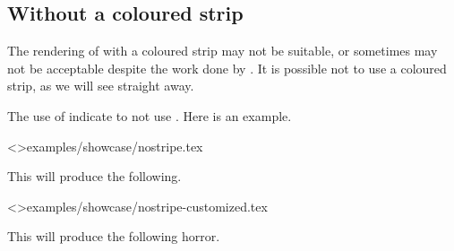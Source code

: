 \documentclass{tutodoc}
\begin{document}
\subsection{Without a coloured strip}

The rendering of  with a coloured strip may not be suitable, or sometimes may not be acceptable despite the work done by .
It is possible not to use a coloured strip, as we will see straight away.


\begin{tdocexa}
    The use of  indicate to not use .
    Here is an example.

    \tdoclatexinput<>{examples/showcase/nostripe.tex}

    This will produce the following.

    \medskip

    
\end{tdocexa}




\begin{tdocexa}
    \leavevmode

    \tdoclatexinput<>{examples/showcase/nostripe-customized.tex}

    This will produce the following horror.

    \medskip

    
\end{tdocexa}
\end{document}
